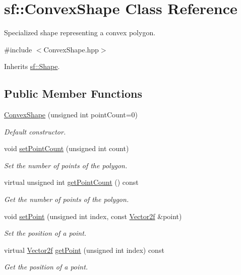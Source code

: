 \hypertarget{classsf_1_1_convex_shape}{\section{sf\+:\+:Convex\+Shape Class Reference}
\label{classsf_1_1_convex_shape}
}


Specialized shape representing a convex polygon.  




{\ttfamily \#include $<$Convex\+Shape.\+hpp$>$}



Inherits \hyperlink{classsf_1_1_shape}{sf\+::\+Shape}.

\subsection*{Public Member Functions}
\begin{DoxyCompactItemize}
\item 
\hyperlink{classsf_1_1_convex_shape_a4f4686f57622bfbbe419ac1420b1432a}{Convex\+Shape} (unsigned int point\+Count=0)
\begin{DoxyCompactList}\small\item\em Default constructor. \end{DoxyCompactList}\item 
void \hyperlink{classsf_1_1_convex_shape_aea7c3f0f08f5cd457fe128a75b7c1e70}{set\+Point\+Count} (unsigned int count)
\begin{DoxyCompactList}\small\item\em Set the number of points of the polygon. \end{DoxyCompactList}\item 
virtual unsigned int \hyperlink{classsf_1_1_convex_shape_af81b86134fe54f2d50d9fab0db065ef1}{get\+Point\+Count} () const 
\begin{DoxyCompactList}\small\item\em Get the number of points of the polygon. \end{DoxyCompactList}\item 
void \hyperlink{classsf_1_1_convex_shape_ae5c7f87d0e776952e2ec6f0aa12ded31}{set\+Point} (unsigned int index, const \hyperlink{classsf_1_1_vector2}{Vector2f} \&point)
\begin{DoxyCompactList}\small\item\em Set the position of a point. \end{DoxyCompactList}\item 
virtual \hyperlink{classsf_1_1_vector2}{Vector2f} \hyperlink{classsf_1_1_convex_shape_ae2a18b837cd4454e340599a220c09a34}{get\+Point} (unsigned int index) const 
\begin{DoxyCompactList}\small\item\em Get the position of a point. \end{DoxyCompactList}\end{DoxyCompactItemize}
